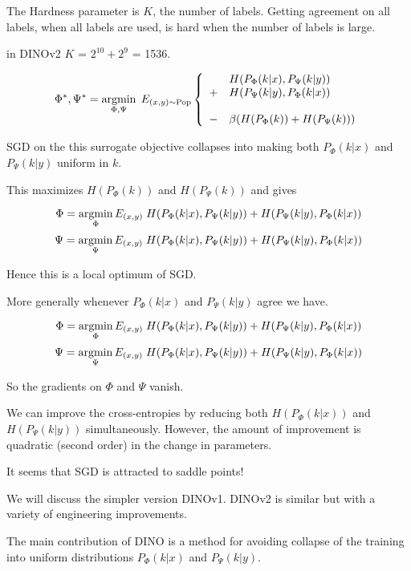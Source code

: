 {{\vfill
The Hardness parameter is $K$, the number of labels.  Getting agreement on all labels, when all labels are used, is hard when the number of labels is large.

\vfill
in DINOv2 $K$ = $2^{10} + 2^9$ = 1536.


$$\Phi^*,\Psi^* = \operatorname*{argmin}_{\Phi,\Psi}\;E_{(x,y)\sim \mathrm{Pop}} \left\{\begin{array}{cl}&H(P_\Phi(k|x),P_\Psi(k|y)) \\ +& H(P_\Psi(k|y),P_\Phi(k|x)) \\ \\ - & \beta(H(P_\Phi(k)) + H(P_\Psi(k)))\end{array}\right.$$

\vfill
SGD on the this surrogate objective collapses into making both $P_\Phi(k|x)$ and $P_\Psi(k|y)$ uniform in $k$.

\vfill
This maximizes $H(P_\Phi(k))$ and $H(P_\Psi(k))$ and gives

$$\Phi = \operatorname*{argmin}_\Phi E_{(x,y)}\;H(P_\Phi(k|x),P_\Psi(k|y)) + H(P_\Psi(k|y),P_\Phi(k|x))$$
$$\Psi = \operatorname*{argmin}_\Psi E_{(x,y)}\;H(P_\Phi(k|x),P_\Psi(k|y)) + H(P_\Psi(k|y),P_\Phi(k|x))$$

\vfill
Hence this is a local optimum of SGD.


More generally whenever $P_\Phi(k|x)$ and $P_\Psi(k|y)$ agree we have.

$$\Phi = \operatorname*{argmin}_\Phi E_{(x,y)}\;H(P_\Phi(k|x),P_\Psi(k|y)) + H(P_\Psi(k|y),P_\Phi(k|x))$$
$$\Psi = \operatorname*{argmin}_\Psi E_{(x,y)}\;H(P_\Phi(k|x),P_\Psi(k|y)) + H(P_\Psi(k|y),P_\Phi(k|x))$$

\vfill
So the gradients on $\Phi$ and $\Psi$ vanish.

\vfill
We can improve the cross-entropies by reducing both $H(P_\Phi(k|x))$ and $H(P_\Psi(k|y))$ simultaneously.
However, the amount of improvement is quadratic (second order) in the change in parameters.

\vfill
It seems that SGD is attracted to saddle points!


We will discuss the simpler version DINOv1. DINOv2 is similar but with a variety of engineering improvements.

\vfill
The main contribution of DINO is a method for avoiding collapse of the training into uniform distributions $P_\Phi(k|x)$ and $P_\Psi(k|y)$.

}}
